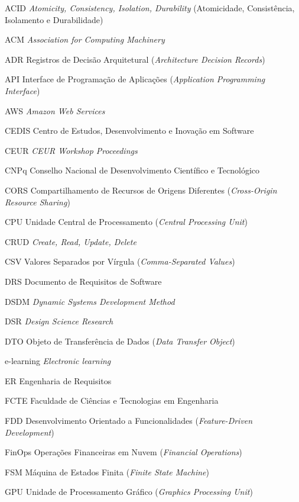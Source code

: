 \begin{siglas}
  \item[ACID] \textit{Atomicity, Consistency, Isolation, Durability} (Atomicidade, Consistência, Isolamento e Durabilidade)
  \item[ACM] \textit{Association for Computing Machinery}
  \item[ADR] Registros de Decisão Arquitetural (\textit{Architecture Decision Records})
  \item[API] Interface de Programação de Aplicações (\textit{Application Programming Interface})
  \item[AWS] \textit{Amazon Web Services}
  \item[CEDIS] Centro de Estudos, Desenvolvimento e Inovação em Software
  \item[CEUR] \textit{CEUR Workshop Proceedings}
  \item[CNPq] Conselho Nacional de Desenvolvimento Científico e Tecnológico
  \item[CORS] Compartilhamento de Recursos de Origens Diferentes (\textit{Cross-Origin Resource Sharing})
  \item[CPU] Unidade Central de Processamento (\textit{Central Processing Unit})
  \item[CRUD] \textit{Create, Read, Update, Delete}
  \item[CSV] Valores Separados por Vírgula (\textit{Comma-Separated Values})
  \item[DRS] Documento de Requisitos de Software
  \item[DSDM] \textit{Dynamic Systems Development Method}
  \item[DSR] \textit{Design Science Research}
  \item[DTO] Objeto de Transferência de Dados (\textit{Data Transfer Object})
  \item[e-learning] \textit{Electronic learning}
  \item[ER] Engenharia de Requisitos
  \item[FCTE] Faculdade de Ciências e Tecnologias em Engenharia
  \item[FDD] Desenvolvimento Orientado a Funcionalidades (\textit{Feature-Driven Development})
  \item[FinOps] Operações Financeiras em Nuvem (\textit{Financial Operations})
  \item[FSM] Máquina de Estados Finita (\textit{Finite State Machine})
  \item[GPU] Unidade de Processamento Gráfico (\textit{Graphics Processing Unit})

\end{siglas}
